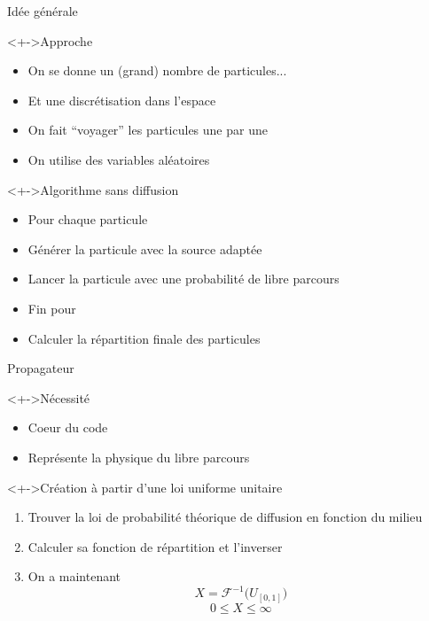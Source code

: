 \documentclass[17pt]{beamer}
\newenvironment{blockitemize}[1]{
  \begin{block}<+->{#1}
    \begin{itemize}
    }{
    \end{itemize}
  \end{block}
}
\newenvironment{blockenumerate}[1]{
  \begin{block}<+->{#1}
    \begin{enumerate}
    }{
    \end{enumerate}
  \end{block}
}
\newcommand{\F}{\mathcal{F}}
\newcommand{\U}{U_{[0,1]}}
\newcommand{\rb}{\textcolor{red}{\textbullet}}
\begin{document}
\begin{frame}{Idée générale}
  \begin{blockitemize}{Approche}
  \item On se donne un (grand) nombre de particules...
  \item Et une discrétisation dans l'espace
  \item On fait ``voyager'' les particules une par une
  \item On utilise des variables aléatoires
  \end{blockitemize}

  \begin{blockitemize}{Algorithme sans diffusion}
  \item[\rb] Pour chaque particule
    \setlength\itemindent{35pt}
  \item Générer la particule avec la source adaptée
  \item Lancer la particule avec une probabilité de libre parcours
    \setlength\itemindent{0pt}
  \item[\rb] Fin pour
  \item Calculer la répartition finale des particules
  \end{blockitemize}
\end{frame}

\begin{frame}{Propagateur}
  \begin{blockitemize}{Nécessité}
  \item Coeur du code
  \item Représente la physique du libre parcours 
  \end{blockitemize}
  \begin{blockenumerate}{Création à partir d'une loi uniforme unitaire}
  \item Trouver la loi de probabilité théorique de diffusion en fonction du milieu
  \item Calculer sa fonction de répartition et l'inverser
  \item On a maintenant
    \[ X = \F^{-1}\big(\U\big) \]
    \[ 0\leq X \leq \infty\]
  \end{blockenumerate}
\end{frame}
\end{document}
